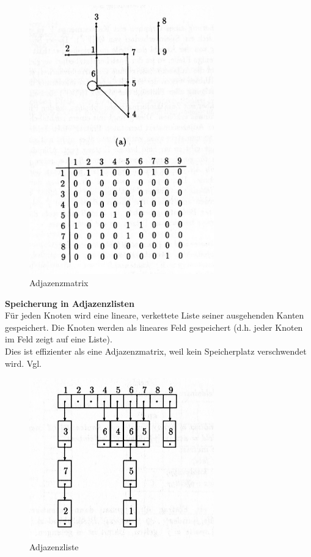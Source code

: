 \begin{figure}[h]
\centering
\includegraphics[width = 8cm]{./chapters/adjazenzmatrix.jpg}
\caption{Adjazenzmatrix \cite[S.539 Abb. 8.4]{OttWid90}
}
\label{a2}
\end{figure}
 
\textbf{Speicherung in Adjazenzlisten}\\
Für jeden Knoten wird eine lineare, verkettete Liste seiner ausgehenden Kanten gespeichert.
Die Knoten werden als lineares Feld gespeichert (d.h. jeder Knoten im Feld zeigt auf eine Liste). \\
Dies ist effizienter als eine Adjazenzmatrix, weil kein Speicherplatz verschwendet wird.
Vgl. \cite[S.541-542  Speicherung in Adjazenzlisten]{OttWid90} \\

\begin{figure}[h]
\centering
\includegraphics[width = 8cm]{./chapters/adjazenzliste.jpg}
\caption{Adjazenzliste \cite[S542 Abb 8.6]{OttWid90}
}
\label{a3}
\end{figure} 

